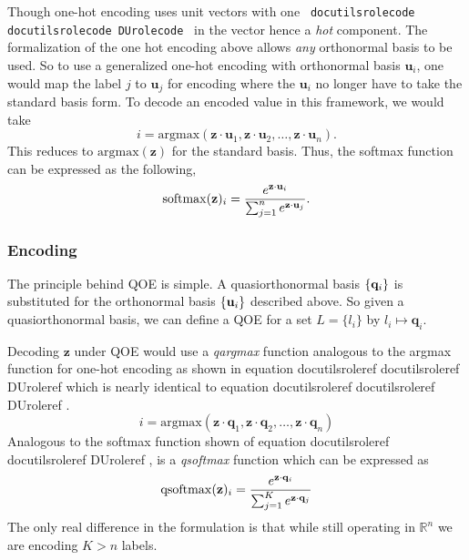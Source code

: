 \documentclass[]{article}
\providecommand*{\DUrole}[2]{%
  \ifcsname docutilsrole#1\endcsname%
    \csname docutilsrole#1\endcsname{#2}%
  \else
    \csname DUrole#1\endcsname{#2}%
  \fi%
}
\begin{document}
Though one-hot encoding uses unit vectors
with one \texttt{\DUrole{code}{1}} in the vector hence a \emph{hot} component. The
formalization of the one hot encoding above allows \emph{any} orthonormal
basis to be used. So to use a generalized one-hot encoding with
orthonormal basis ${\mathbf{u}_i}$, one would map the label
$j$ to ${\mathbf{u}_j}$ for encoding where the
${\mathbf{u}_i}$ no longer have to take the standard basis form.
To decode an encoded value in this framework, we would take\begin{equation}
\label{eq:argmax}
i = \mathrm{argmax}(\mathbf{z}\cdot\mathbf{u}_1,\mathbf{z}\cdot\mathbf{u}_2,\ldots,\mathbf{z}\cdot\mathbf{u}_n).
\end{equation}This reduces to $\mathrm{argmax}(\mathbf{z})$ for the standard
basis. Thus, the softmax function can be expressed as the following,\begin{equation}
\label{eq:gsoftmax}
\mathrm{softmax}({\bf z})_i={e^{{\bf z}\cdot {\bf u}_i}\over \sum_{j=1}^n e^{{\bf z}\cdot {\bf u}_j}}.
\end{equation}

\subsubsection{Encoding%
  \label{encoding}%
}
The principle behind QOE is simple. A quasiorthonormal basis $\{{\bf q}_i\}$ is
substituted for the orthonormal basis $\{{\bf u}_i\}$ described above. So given a
quasiorthonormal basis, we can define a QOE for a set $L=\{l_i\}$
by $l_i \mapsto \mathbf{q}_i$.

Decoding $\mathbf{z}$ under QOE would use a \emph{qargmax} function analogous to the argmax function for one-hot encoding as shown in equation \DUrole{ref}{eq:qargmax} which is nearly identical to equation \DUrole{ref}{eq:argmax}.\begin{equation}
\label{eq:qargmax}
i = \mathrm{argmax}(\mathbf{z}\cdot\mathbf{q}_1,\mathbf{z}\cdot\mathbf{q}_2,\ldots,\mathbf{z}\cdot\mathbf{q}_n)
\end{equation}Analogous to the softmax function shown of equation \DUrole{ref}{eq:gsoftmax}, is a \emph{qsoftmax} function which can be expressed as\begin{equation}
\label{eq:qsoftmax}
\mathrm{qsoftmax}({\bf z})_i={e^{{\bf z}\cdot {\bf q}_i}\over \sum_{j=1}^K
e^{{\bf z}\cdot {\bf q}_j}}
\end{equation}The only real difference in the formulation is that while still
operating in ${\mathbb R}^n$ we are encoding $K>n$ labels.
\end{document}
